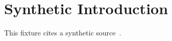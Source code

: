 \documentclass{article}
\begin{document}
\section{Synthetic Introduction}
\label{sec:introduction}
This fixture cites a synthetic source~\cite{example2026}.



\end{document}
